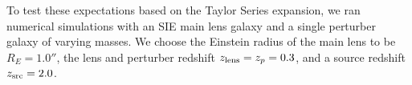 To test these expectations based on the Taylor Series expansion, we ran numerical simulations with an SIE main lens galaxy and a single perturber galaxy of varying masses. We choose the Einstein radius of the main lens to be $R_E = 1.0''$,  the lens and perturber redshift $z_{\rm{lens}} = z_p = 0.3$, and a source redshift $z_{\rm{src}} = 2.0$.